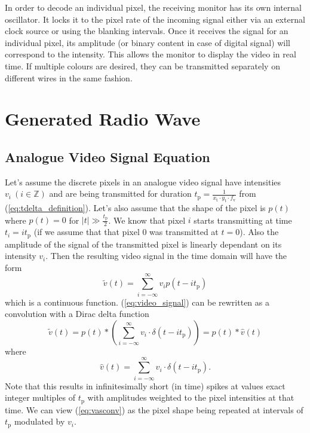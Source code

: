 \documentclass[a4paper,12pt,twoside,openright]{report}
\begin{document}
In order to decode an individual pixel, the receiving monitor has its own internal oscillator. It locks it to the pixel rate of the incoming signal either via an external clock source or using the blanking intervals. Once it receives the signal for an individual pixel, its amplitude (or binary content in case of digital signal) will correspond to the intensity. This allows the monitor to display the video in real time. If multiple colours are desired, they can be transmitted separately on different wires in the same fashion.

\section{Generated Radio Wave}

\subsection{Analogue Video Signal Equation}

Let's assume the discrete pixels in an analogue video signal have intensities $v_{i}\ (i \in \mathbb{Z})$ and are being transmitted for duration $t_\text{p}=\frac{1}{x_\text{t} \cdot y_\text{t} \cdot f_\text{v}}$ from (\ref{eq:tdelta_definition}). Let's also assume that the shape of the pixel is $p(t)$ where $p(t)=0$ for $|t| \gg \frac{t_\text{p}}{2}$. We know that pixel $i$ starts transmitting at time $t_{i}=i t_\text{p}$ (if we assume that that pixel $0$ was transmitted at $t=0$). Also the amplitude of the signal of the transmitted pixel is linearly dependant on its intensity $v_{i}$. Then the resulting video signal in the time domain will have the form 
\begin{equation}
\label{eq:video_signal}
\tilde{v}(t) = \sum\limits_{i=-\infty}^{\infty} v_{i} p(t-i t_\text{p})
\end{equation}
which is a continuous function. (\ref{eq:video_signal}) can be rewritten as a convolution with a Dirac delta function
\begin{equation}
\label{eq:vasconv}
\tilde{v}(t) = p(t) \ast \left( \sum\limits_{i=-\infty}^{\infty} v_{i} \cdot \delta(t-i t_\text{p}) \right) = p(t) \ast \hat{v}(t)
\end{equation}
where
\begin{equation}
\label{eq:vhattdef}
\hat{v}(t) = \sum\limits_{i=-\infty}^{\infty} v_{i} \cdot \delta(t-i t_\text{p}) .
\end{equation}
Note that this results in infinitesimally short (in time) spikes at values exact integer multiples of $t_\text{p}$ with amplitudes weighted to the pixel intensities at that time. We can view (\ref{eq:vasconv}) as the pixel shape being repeated at intervals of $t_\text{p}$ modulated by $v_{i}$. 
\end{document}
